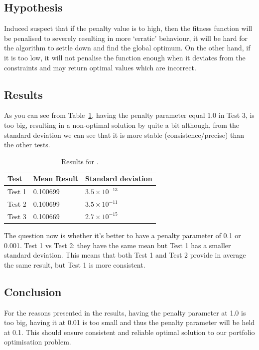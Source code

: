 \documentclass{pdfmx4020}
\begin{document}
    \subsection{Hypothesis}
    Induced suspect that if the penalty value is to high, then the fitness function will be penalised to severely resulting in more `erratic' behaviour, it will be hard for the algorithm to settle down and find the global optimum. On the other hand, if it is too low, it will not penalise the function enough when it deviates from the constraints and may return optimal values which are incorrect. 

    \subsection{Results}
    As you can see from Table~\ref{table:penalty_results}, having the penalty parameter equal 1.0 in Test 3, is too big, resulting in a non-optimal solution by quite a bit although, from the standard deviation we can see that it is more stable (consistence/precise) than the other tests.
        \begin{table}[H]
          \setlength{\extrarowheight}{2.0pt}
          \begin{tabular}{|l|l|l|}
            \hline
            Test & Mean Result & Standard deviation \\
            \hline
            Test 1 & 0.100699 & $3.5\times10^{-13}$ \\
            \hline
            Test 2 & 0.100699 & $3.5\times10^{-11}$ \\
            \hline
            Test 3 & 0.100669 & $2.7\times10^{-15}$ \\
            \hline
          \end{tabular}
          \caption{Results for .}
          \label{table:penalty_results}
        \end{table}

      The question now is whether it's better to have a penalty parameter of 0.1 or 0.001. Test 1 vs Test 2: they have the same mean but Test 1 has a smaller standard deviation. This means that both Test 1 and Test 2 provide in average the same result, but Test 1 is more consistent.

    \subsection{Conclusion}
      For the reasons presented in the results, having the penalty parameter at 1.0 is too big, having it at 0.01 is too small and thus the penalty parameter will be held at 0.1. This should ensure consistent and reliable optimal solution to our portfolio optimisation problem.
\end{document}
